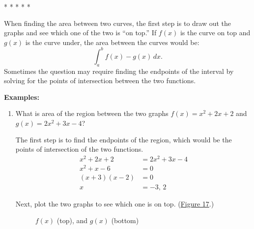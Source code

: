 \documentclass[12pt]{article}
\begin{document}
\begin{center}
	* * * * *
\end{center}

When finding the area between two curves, the first step is to draw out the graphs and see which one of the two is ``on top.'' If $f(x)$ is the curve on top and $g(x)$ is the curve under, the area between the curves would be:
\[ \int_a^b f(x) - g(x) \, dx. \]
Sometimes the question may require finding the endpoints of the interval by solving for the points of intersection between the two functions.

\noindent \textbf{Examples:}
\begin{enumerate}
	\item What is area of the region between the two graphs $f(x) = x^2 + 2x + 2$ and $g(x) = 2x^2 + 3x - 4$?

	      The first step is to find the endpoints of the region, which would be the points of intersection of the two functions.
	      \begin{align*}
		      x^2 + 2x + 2 & = 2x^2 + 3x - 4 \\
		      x^2 + x - 6  & = 0             \\
		      (x+3)(x-2)   & = 0             \\
		      x            & = -3, \, 2
	      \end{align*}

	      Next, plot the two graphs to see which one is on top. (\hyperref[fig:abcx1]{Figure 17}.)

	      \begin{figure}[H]
		      \begin{center}
			      \caption{$f(x)$ (top), and $g(x)$ (bottom)}
			      \label{fig:abcx1}
		      \end{center}
	      \end{figure}


\end{enumerate}
\end{document}

